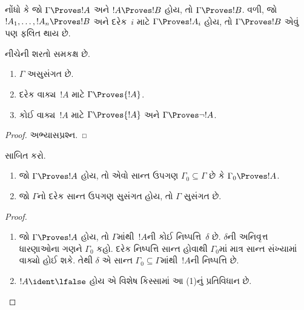 નોંધો કે જો $\Gamma \Proves !A$ અને $!A \Proves !B$ હોય, તો
$\Gamma \Proves !B$. વળી, જો $!A_1, \dots, !A_n \Proves !B$ અને
દરેક~$i$ માટે $\Gamma \Proves !A_i$ હોય, તો $\Gamma \Proves !B$
એવું પણ ફલિત થાય છે.

\begin{prop}
નીચેની શરતો સમકક્ષ છે.
    \begin{enumerate}
      \item \( \Gamma \) અસુસંગત છે.
      \item દરેક વાક્ય~\( {!A} \) માટે \( \Gamma \Proves {!A} \).
      \item કોઈ વાક્ય~\( {!A} \) માટે \( \Gamma \Proves {!A} \) અને \( \Gamma \Proves \lnot {!A} \).
    \end{enumerate}
\end{prop}

\begin{proof}
અભ્યાસપ્રશ્ન.
\end{proof}


\begin{prob}
 સાબિત કરો.
\end{prob}




\begin{prop}[સઘનતા]
  \begin{enumerate}
  \item જો $\Gamma \Proves !A$ હોય, તો એવો સાન્ત ઉપગણ
    $\Gamma_0 \subseteq \Gamma$ છે કે $\Gamma_0 \Proves !A$.
  \item જો $\Gamma$નો દરેક સાન્ત ઉપગણ સુસંગત હોય, તો $\Gamma$ સુસંગત છે.
  \end{enumerate}
\end{prop}

\begin{proof}
  \begin{enumerate}
    \item જો $\Gamma \Proves !A$ હોય, તો $\Gamma$માંથી~$!A$ની કોઈ
      નિષ્પત્તિ~$\delta$ છે. $\delta$ની અનિવૃત્ત
      ધારણાઓના ગણને $\Gamma_0$ કહો. દરેક નિષ્પત્તિ સાન્ત હોવાથી
      $\Gamma_0$માં માત્ર સાન્ત સંખ્યામાં વાક્યો હોઈ શકે. તેથી
      $\delta$ એ સાન્ત $\Gamma_0 \subseteq \Gamma$માંથી~$!A$ની
      નિષ્પત્તિ છે.
    \item $!A \ident \lfalse$ હોય એ વિશેષ કિસ્સામાં આ (1)નું
      પ્રતિવિધાન છે.
  \end{enumerate}
\end{proof}
\endgroup


